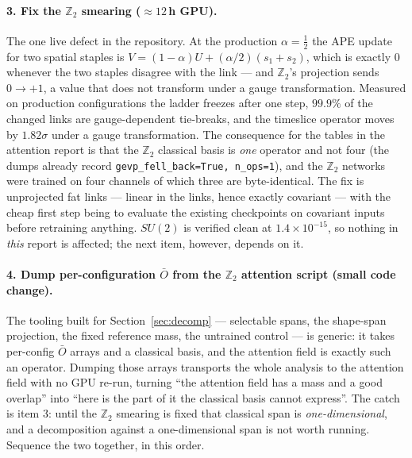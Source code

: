 \documentclass[11pt,a4paper]{article}
\newcommand{\Obar}{\bar{O}}
\begin{document}
\paragraph{3. Fix the $\mathbb{Z}_2$ smearing ($\approx12$\,h GPU).} The one
live defect in the repository. At the production $\alpha = \tfrac12$ the APE
update for two spatial staples is $V = (1-\alpha)U + (\alpha/2)(s_1+s_2)$, which
is exactly $0$ whenever the two staples disagree with the link --- and
$\mathbb{Z}_2$'s projection sends $0 \to +1$, a value that does not transform
under a gauge transformation. Measured on production configurations the ladder
freezes after one step, $99.9\%$ of the changed links are gauge-dependent
tie-breaks, and the timeslice operator moves by $1.82\sigma$ under a gauge
transformation. The consequence for the tables in the attention report is that
the $\mathbb{Z}_2$ classical basis is \emph{one} operator and not four (the
dumps already record \texttt{gevp\_fell\_back=True, n\_ops=1}), and the
$\mathbb{Z}_2$ networks were trained on four channels of which three are
byte-identical. The fix is unprojected fat links --- linear in the links, hence
exactly covariant --- with the cheap first step being to evaluate the existing
checkpoints on covariant inputs before retraining anything. $SU(2)$ is verified
clean at $1.4\times10^{-15}$, so nothing in \emph{this} report is affected; the
next item, however, depends on it.

\paragraph{4. Dump per-configuration $\Obar$ from the $\mathbb{Z}_2$ attention
script (small code change).} The tooling built for Section~\ref{sec:decomp} ---
selectable spans, the shape-span projection, the fixed reference mass, the
untrained control --- is generic: it takes per-config $\Obar$ arrays and a
classical basis, and the attention field is exactly such an operator. Dumping
those arrays transports the whole analysis to the attention field with no GPU
re-run, turning ``the attention field has a mass and a good overlap'' into
``here is the part of it the classical basis cannot express''. The catch is item
3: until the $\mathbb{Z}_2$ smearing is fixed that classical span is
\emph{one-dimensional}, and a decomposition against a one-dimensional span is
not worth running. Sequence the two together, in this order.
\end{document}
